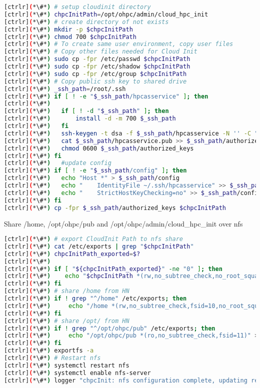 \begin{lstlisting}[language=bash,keywords={}]
[ctrlr](*\#*) # setup cloudinit directory
[ctrlr](*\#*) chpcInitPath=/opt/ohpc/admin/cloud_hpc_init
[ctrlr](*\#*) # create directory of not exists
[ctrlr](*\#*) mkdir -p $chpcInitPath
[ctrlr](*\#*) chmod 700 $chpcInitPath
[ctrlr](*\#*) # To create same user environment, copy user files 
[ctrlr](*\#*) # Copy other files needed for Cloud Init
[ctrlr](*\#*) sudo cp -fpr /etc/passwd $chpcInitPath
[ctrlr](*\#*) sudo cp -fpr /etc/shadow $chpcInitPath
[ctrlr](*\#*) sudo cp -fpr /etc/group $chpcInitPath
[ctrlr](*\#*) # Copy public ssh key to shared drive
[ctrlr](*\#*) _ssh_path=/root/.ssh
[ctrlr](*\#*) if [ ! -e "$_ssh_path/hpcasservice" ]; then
[ctrlr](*\#*) 
[ctrlr](*\#*) 	if [ ! -d "$_ssh_path" ]; then
[ctrlr](*\#*) 		install -d -m 700 $_ssh_path
[ctrlr](*\#*) 	fi
[ctrlr](*\#*) 	ssh-keygen -t dsa -f $_ssh_path/hpcasservice -N '' -C "HPC Cluster key" > /dev/null 2>&1
[ctrlr](*\#*) 	cat $_ssh_path/hpcasservice.pub >> $_ssh_path/authorized_keys
[ctrlr](*\#*) 	chmod 0600 $_ssh_path/authorized_keys
[ctrlr](*\#*) fi
[ctrlr](*\#*) 	#update config
[ctrlr](*\#*) if [ ! -e "$_ssh_path/config" ]; then
[ctrlr](*\#*) 	echo "Host *" > $_ssh_path/config
[ctrlr](*\#*) 	echo "    IdentityFile ~/.ssh/hpcasservice" >> $_ssh_path/config
[ctrlr](*\#*) 	echo "    StrictHostKeyChecking=no" >> $_ssh_path/config
[ctrlr](*\#*) fi
[ctrlr](*\#*) cp -fpr $_ssh_path/authorized_keys $chpcInitPath

\end{lstlisting} 

	Share /home, /opt/ohpc/pub and /opt/ohpc/admin/cloud\_hpc\_init over nfs


\begin{lstlisting}[language=bash,keywords={}]
[ctrlr](*\#*) # export CloudInit Path to nfs share
[ctrlr](*\#*) cat /etc/exports | grep "$chpcInitPath"
[ctrlr](*\#*) chpcInitPath_exported=$?
[ctrlr](*\#*) 
[ctrlr](*\#*) if [ "${chpcInitPath_exported}" -ne "0" ]; then
[ctrlr](*\#*)    echo "$chpcInitPath *(rw,no_subtree_check,no_root_squash)" >> /etc/exports
[ctrlr](*\#*) fi
[ctrlr](*\#*) # share /home from HN
[ctrlr](*\#*) if ! grep "^/home" /etc/exports; then
[ctrlr](*\#*)     echo "/home *(rw,no_subtree_check,fsid=10,no_root_squash)" >> /etc/exports
[ctrlr](*\#*) fi
[ctrlr](*\#*) # share /opt/ from HN
[ctrlr](*\#*) if ! grep "^/opt/ohpc/pub" /etc/exports; then
[ctrlr](*\#*)     echo "/opt/ohpc/pub *(ro,no_subtree_check,fsid=11)" >> /etc/exports
[ctrlr](*\#*) fi
[ctrlr](*\#*) exportfs -a
[ctrlr](*\#*) # Restart nfs
[ctrlr](*\#*) systemctl restart nfs
[ctrlr](*\#*) systemctl enable nfs-server
[ctrlr](*\#*) logger "chpcInit: nfs configuration complete, updating remaining HPC configuration" 
\end{lstlisting} 

